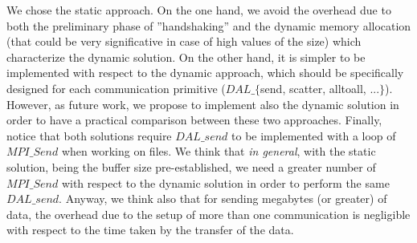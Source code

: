 We chose the static approach. On the one hand, we avoid the overhead due to both the preliminary phase of ''handshaking'' and the dynamic memory allocation (that could be very significative in case of high values of the size) which characterize the dynamic solution. On the other hand, it is simpler to be implemented with respect to the dynamic approach, which should be specifically designed for each communication primitive ($DAL\_\lbrace$send, scatter, alltoall, ...$\rbrace$). However, as future work, we propose to implement also the dynamic solution in order to have a practical comparison between these two approaches. Finally, notice that both solutions require $DAL\_send$ to be implemented with a loop of $MPI\_Send$ when working on files. We think that \textit{in general}, with the static solution, being the buffer size pre-established, we need a greater number of $MPI\_Send$ with respect to the dynamic solution in order to perform the same $DAL\_send$. Anyway, we think also that for sending megabytes (or greater) of data, the overhead due to the setup of more than one communication is negligible with respect to the time taken by the transfer of the data.